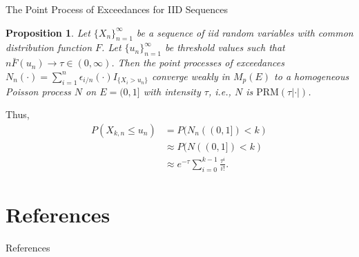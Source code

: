 \documentclass{beamer}
\newcommand{\PRM}{\text{PRM}}
\newtheorem{proposition}{Proposition}
\begin{document}
\begin{frame}{The Point Process of Exceedances for IID Sequences}
    \begin{proposition}
        Let $\{X_n\}_{n = 1}^{\infty}$ be a sequence of iid random variables with common distribution function $F$. Let $\{u_n\}_{n = 1}^{\infty}$ be threshold values such that $n\bar{F}(u_n) \to \tau \in (0, \infty)$. Then the point processes of exceedances $N_n(\cdot) = \sum_{i = 1}^n \epsilon_{i / n}(\cdot)I_{\{X_i > u_n\}}$ converge weakly in $M_p(E)$ to a homogeneous Poisson process $N$ on $E = (0, 1]$ with intensity $\tau$, i.e., $N$ is $\PRM(\tau|\cdot|)$.
    \end{proposition}

    Thus,
    \begin{align*}
        P(X_{k, n} \le u_n) &= P(N_n((0, 1]) < k) \\
        &\approx P(N((0, 1]) < k) \\
        &\approx e^{-\tau}\sum_{i = 0}^{k - 1} \frac{\tau^i}{i!}.
    \end{align*}
\end{frame}

\section{References}

\begin{frame}[allowframebreaks]{References}
    \nocite{*}
    \printbibliography
\end{frame}
\end{document}
